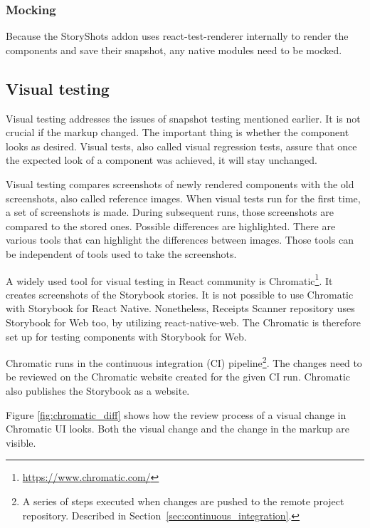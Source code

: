 \documentclass[
  printed, %
  table,   %
  oneside, %
  lof,     %
  lot,     %
]{fithesis3}
\begin{document}
\subsubsection{Mocking}
Because the StoryShots addon uses react-test-renderer internally to render the components and save their snapshot, any native modules need to be mocked.

\subsection{Visual testing}
\label{sec:visual_testing}
Visual testing addresses the issues of snapshot testing mentioned earlier. It is not crucial if the markup changed. The important thing is whether the component looks as desired. Visual tests, also called visual regression tests, assure that once the expected look of a component was achieved, it will stay unchanged.

Visual testing compares screenshots of newly rendered components with the old screenshots, also called reference images.
When visual tests run for the first time, a set of screenshots is made. During subsequent runs, those screenshots are compared to the stored ones. Possible differences are highlighted. There are various tools that can highlight the differences between images. Those tools can be independent of tools used to take the screenshots.

A widely used tool for visual testing in React community is Chromatic\footnote{\url{https://www.chromatic.com/}}. It creates screenshots of the Storybook stories. It is not possible to use Chromatic with Storybook for React Native. Nonetheless, Receipts Scanner repository uses Storybook for Web too, by utilizing react-native-web. The Chromatic is therefore set up for testing components with Storybook for Web.

Chromatic runs in the continuous integration (CI) pipeline\footnote{A series of steps executed when changes are pushed to the remote project repository. Described in Section~\ref{sec:continuous_integration}.}. The changes need to be reviewed on the Chromatic website created for the given CI run. Chromatic also publishes the Storybook as a website.

Figure \ref{fig:chromatic_diff} shows how the review process of a visual change in Chromatic UI looks. Both the visual change and the change in the markup are visible.
\end{document}
